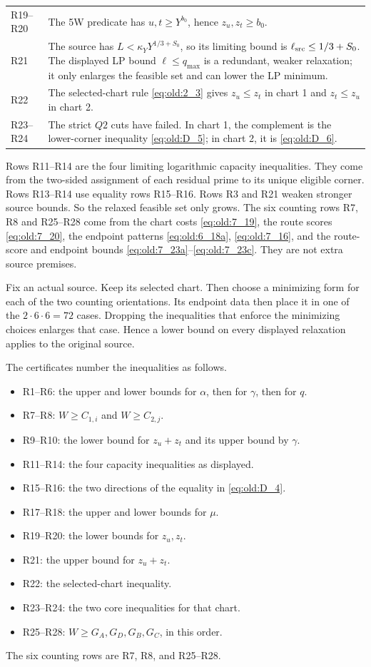 \begin{longtable}{@{}p{}p{}@{}}
R19--R20 & The 5W predicate has \(u,t\ge Y^{b_0}\), hence
\(z_u,z_t\ge b_0\). \\
R21 & The source has \(L<\kappa_YY^{1/3+S_0}\), so its limiting
bound is \(\ell_{\rm src}\le1/3+S_0\). The displayed LP bound
\(\ell\le q_{\max}\)
is a redundant, weaker relaxation; it only enlarges the feasible set and
can lower the LP minimum. \\
R22 & The selected-chart rule \eqref{eq:old:2_3} gives \(z_u\le z_t\) in
chart 1 and \(z_t\le z_u\) in chart 2. \\
R23--R24 & The strict \(Q2\) cuts have failed. In chart 1, the complement
is the lower-corner inequality \eqref{eq:old:D_5}; in chart 2, it is
\eqref{eq:old:D_6}. \\
\bottomrule
\end{longtable}
\normalsize

Rows R11--R14 are the four limiting logarithmic capacity inequalities.
They come from the two-sided assignment of each residual prime to its
unique eligible corner. Rows R13--R14 use equality rows R15--R16.
Rows R3 and R21 weaken stronger source bounds. So the
relaxed feasible set only grows. The six counting rows R7, R8 and
R25--R28 come from the chart costs \eqref{eq:old:7_19}, the route scores
\eqref{eq:old:7_20}, the endpoint patterns
\eqref{eq:old:6_18a}, \eqref{eq:old:7_16}, and the route-score and
endpoint bounds \eqref{eq:old:7_23a}--\eqref{eq:old:7_23c}. They are not
extra source premises.

Fix an actual source. Keep its selected chart. Then choose a
minimizing form for each of the two counting orientations. Its endpoint
data then place it in one of the $2\cdot6\cdot6=72$ cases.
Dropping the inequalities that enforce the minimizing choices enlarges
that case. Hence a lower bound on every displayed relaxation applies to
the original source.

The certificates number the inequalities as follows.
\begin{itemize}
\item R1--R6: the upper and lower bounds for $\alpha$, then for
$\gamma$, then for $q$.
\item R7--R8: $W\ge C_{1,i}$ and $W\ge C_{2,j}$.
\item R9--R10: the lower bound for $z_u+z_t$ and its upper bound by $\gamma$.
\item R11--R14: the four capacity inequalities as displayed.
\item R15--R16: the two directions of the equality in \eqref{eq:old:D_4}.
\item R17--R18: the upper and lower bounds for $\mu$.
\item R19--R20: the lower bounds for $z_u,z_t$.
\item R21: the upper bound for $z_u+z_t$.
\item R22: the selected-chart inequality.
\item R23--R24: the two core inequalities for that chart.
\item R25--R28: $W\ge G_A,G_D,G_B,G_C$, in this order.
\end{itemize}
The six counting rows are R7, R8, and R25--R28.

